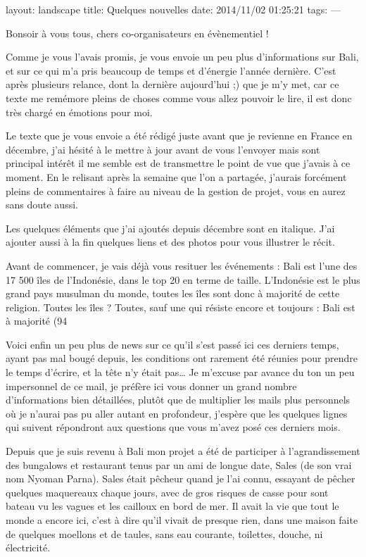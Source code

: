 layout: landscape
title: Quelques nouvelles
date: 2014/11/02 01:25:21
tags:
---

Bonsoir à vous tous, chers co-organisateurs en évènementiel !

Comme je vous l’avais promis, je vous envoie un peu plus d’informations sur Bali, et sur ce qui m’a pris beaucoup de temps et d’énergie l’année dernière. C’est après plusieurs relance, dont la dernière aujourd’hui ;) que je m’y met, car ce texte me remémore pleins de choses comme vous allez pouvoir le lire, il est donc très chargé en émotions pour moi.

Le texte que je vous envoie a été rédigé juste avant que je revienne en France en décembre, j’ai hésité à le mettre à jour avant de vous l'envoyer mais sont principal intérêt il me semble est de transmettre le point de vue que j’avais à ce moment. En le relisant après la semaine que l’on a partagée, j’aurais forcément pleins de commentaires à faire au niveau de la gestion de projet, vous en aurez sans doute aussi.

Les quelques éléments que j’ai ajoutés depuis décembre sont en italique. J’ai ajouter aussi à la fin quelques liens et des photos pour vous illustrer le récit.

Avant de commencer, je vais déjà vous resituer les événements : Bali est l’une des 17 500 îles de l’Indonésie, dans le top 20 en terme de taille. L’Indonésie est le plus grand pays musulman du monde, toutes les îles sont donc à majorité de cette religion. Toutes les îles ? Toutes, sauf une qui résiste encore et toujours : Bali est à majorité (94%

Voici enfin un peu plus de news sur ce qu’il s’est passé ici ces derniers temps, ayant pas mal bougé depuis, les conditions ont rarement été réunies pour prendre le temps d’écrire, et la tête n’y était pas… Je m’excuse par avance du ton un peu impersonnel de ce mail, je préfère ici vous donner un grand nombre d’informations bien détaillées, plutôt que de multiplier les mails plus personnels où je n’aurai pas pu aller autant en profondeur, j’espère que les quelques lignes qui suivent répondront aux questions que vous m’avez posé ces derniers mois.

Depuis que je suis revenu à Bali mon projet a été de participer à l’agrandissement des bungalows et restaurant tenus par un ami de longue date, Sales (de son vrai nom Nyoman Parna). Sales était pêcheur quand je l’ai connu, essayant de pêcher quelques maquereaux chaque jours, avec de gros risques de casse pour sont bateau vu les vagues et les cailloux en bord de mer. Il avait la vie que tout le monde a encore ici, c’est à dire qu’il vivait de presque rien, dans une maison faite de quelques moellons et de taules, sans eau courante, toilettes, douche, ni électricité.

